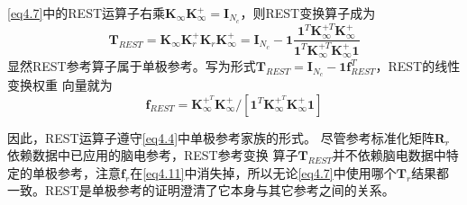 \eqref{eq4.7}中的REST运算子右乘$\mathbf{K}_{\infty}\mathbf{K}_{\infty}^+=\mathbf{I}_{N_c}$，则REST变换算子成为
\begin{equation}\label{eq4.10}
\mathbf{T}_{REST}=\mathbf{K}_{\infty}\mathbf{K}_{r}^+\mathbf{K}_{r}\mathbf{K}_{\infty}^+=\mathbf{I}_{N_c}-\mathbf{1}\frac{\mathbf{1}^T\mathbf{K}_{\infty}^{+T}\mathbf{K}_{\infty}^+}{\mathbf{1}^T\mathbf{K}_{\infty}^{+T}\mathbf{K}_{\infty}^+\mathbf{1}}
\end{equation}
显然REST参考算子属于单极参考。写为形式$\mathbf{T}_{REST}=\mathbf{I}_{N_c}-\mathbf{1}\mathbf{f}_{REST}^T$，REST的线性变换权重
向量就为
\begin{equation}\label{eq4.11}
\mathbf{f}_{REST}=\mathbf{K}_{\infty}^{+^T}\mathbf{K}_{\infty}^+/{[\mathbf{1}^T\mathbf{K}_{\infty}^{+^T}\mathbf{K}_{\infty}^+\mathbf{1}]}
\end{equation}

因此，REST运算子遵守\eqref{eq4.4}中单极参考家族的形式。 尽管参考标准化矩阵$\mathbf{R}_r$依赖数据中已应用的脑电参考，REST参考变换
算子$\mathbf{T}_{REST}$并不依赖脑电数据中特定的单极参考，注意$\mathbf{f}_r$在\eqref{eq4.11}中消失掉，所以无论\eqref{eq4.7}中使用哪个$\mathbf{T}_r$结果都一致。REST是单极参考的证明澄清了它本身与其它参考之间的关系。

